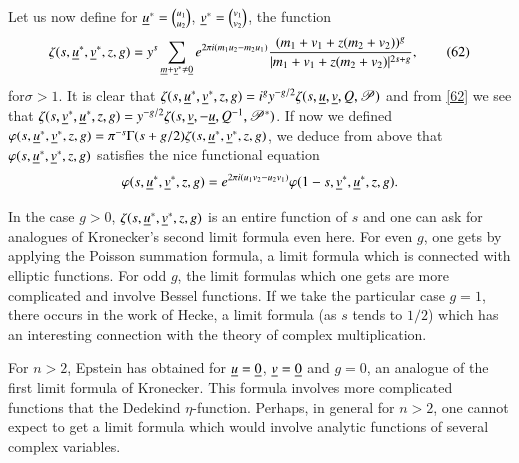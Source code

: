 Let us now define for $\underline{u}^{\ast}=\binom{u_{1}}{u_{2}}$,
$\underline{v}^{\ast}=\binom{v_{1}}{v_{2}}$, the function
\begin{equation*}
\zeta(s,\underline{u}^{\ast},\underline{v}^{\ast},z,g)=y^{s}\sum_{\underline{m}+\underline{v}^{\ast}\neq
  \underline{0}}e^{2\pi
  i(m_{1}u_{2}-m_{2}u_{1})}\frac{(m_{1}+v_{1}+z(m_{2}+v_{2}))^{g}}{|m_{1}+v_{1}+z(m_{2}+v_{2})|^{2s+g}},
\tag{62}\label{62}
\end{equation*}
for\pageoriginale $\sigma>1$. It is clear that
$\zeta(s,\underline{u}^{\ast},\underline{v}^{\ast},z,g)=i^{g}y^{-g/2}\zeta(s,\underline{u},\underline{v},Q,\mathscr{P})$
and from \eqref{62} we see that
$\zeta(s,\underline{v}^{\ast},\underline{u}^{\ast},z,g)=y^{-g/2}\zeta(s,\underline{v},-\underline{u},Q^{-1},\mathscr{P}^{\ast})$. If
now we defined
$\varphi(s,\underline{u}^{\ast},\underline{v}^{\ast},z,g)=\pi^{-s}\Gamma(s+g/2)\zeta(s,\underline{u}^{\ast},\underline{v}^{\ast},z,g)$,
we deduce from above that $\varphi(s,\underline{u}^{\ast},\underline{v}^{\ast},z,g)$
satisfies the nice functional equation
$$
\varphi(s,\underline{u}^{\ast},\underline{v}^{\ast},z,g)=e^{2\pi
  i(u_{1}v_{2}-u_{2}v_{1})}\varphi(1-s,\underline{v}^{\ast}, \underline{u}^{\ast},
z,g). 
$$

In the case $g>0$, $\zeta(s,\underline{u}^{\ast},\underline{v}^{\ast},z,g)$ is an
entire function of $s$ and one can ask for analogues of Kronecker's
second limit formula even here. For even $g$, one gets by applying the
Poisson summation formula, a limit formula which is connected with
elliptic functions. For odd $g$, the limit formulas which one gets are
more complicated and involve Bessel functions. If we take the
particular case $g=1$, there occurs in the work of Hecke, a limit
formula (as $s$ tends to $1/2$) which has an interesting connection
with the theory of complex multiplication.

For $n>2$, Epstein has obtained for $\underline{u}=\underline{0}$, $\underline{v}=\underline{0}$
and $g=0$, an analogue of the first limit formula of Kronecker. This
formula involves more complicated functions that the Dedekind
$\eta$-function. Perhaps, in general for $n>2$, one cannot expect to
get a limit formula which would involve analytic functions of several
complex variables.

